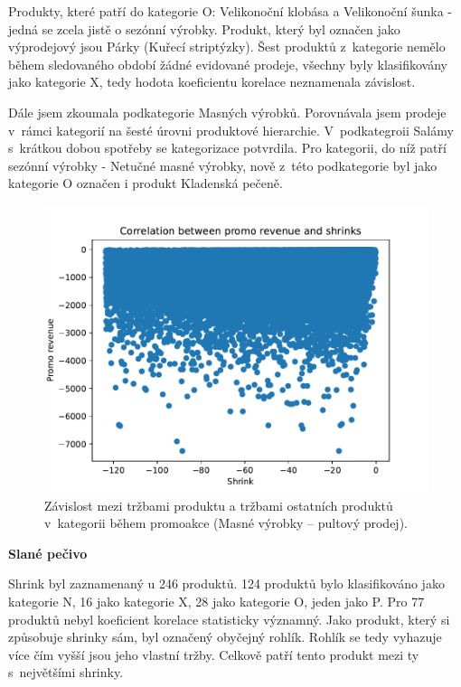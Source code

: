 Produkty, které patří do kategorie O: Velikonoční klobása a Velikonoční šunka - jedná se zcela jistě o sezónní výrobky. Produkt, který byl označen jako výprodejový jsou Párky (Kuřecí striptýzky). Šest produktů z~kategorie nemělo během sledovaného období žádné evidované prodeje, všechny byly klasifikovány jako kategorie X, tedy hodota koeficientu korelace neznamenala závislost. %

Dále jsem zkoumala podkategorie Masných výrobků. Porovnávala jsem prodeje v~rámci kategorií na šesté úrovni produktové hierarchie. V~podkategroii Salámy s~krátkou dobou spotřeby se kategorizace potvrdila. Pro kategorii, do níž patří sezónní výrobky - Netučné masné výrobky, nově z~této podkategorie byl jako kategorie O označen i produkt Kladenská pečeně.

\begin{figure}[h!]
    \centering
    \captionsetup{justification=centering}
    \includegraphics[width=.8\textwidth]{obrazky/grafy/categorization_charts/categorization_charts_L4_PROC MEAT SERVICE.pdf}
    \caption{Závislost mezi tržbami produktu a tržbami ostatních produktů v~kategorii během promoakce (Masné výrobky -- pultový prodej).}
    \label{obr:corr:maso}
\end{figure}

\textbf{Slané pečivo}

Shrink byl zaznamenaný u 246 produktů. 124 produktů bylo klasifikováno jako kategorie N, 16 jako kategorie X, 28 jako kategorie O, jeden jako P. Pro 77 produktů nebyl koeficient korelace statisticky významný. Jako produkt, který si způsobuje shrinky sám, byl označený obyčejný rohlík. Rohlík se tedy vyhazuje více čím vyšší jsou jeho vlastní tržby. Celkově patří tento produkt mezi ty s~největšími shrinky.

